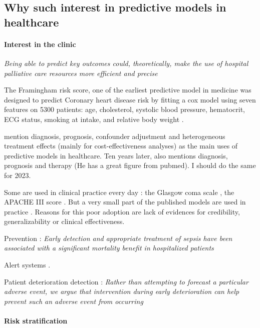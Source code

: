 \documentclass[french,12pt,twoside,a4paper]{book}
\begin{document}
\subsection{Why such interest in predictive models in healthcare}\label{subsec:predictive_models:importance}

\paragraph{Interest in the clinic}

\textit{Being able to predict key outcomes could, theoretically, make the use of
  hospital palliative care resources more efficient and precise} \citep{topol2019high}

The Framingham risk score, one of the earliest predictive model in medicine was
designed to predict Coronary heart disease risk by fitting a cox model using
seven features on 5300 patients: age, cholesterol, systolic blood pressure,
hematocrit, ECG status, smoking at intake, and relative body weight
\citep{brand1976multivariate}.

\citep{harrell2001regression} mention diagnosis, prognosis, confounder adjustment
and heterogeneous treatment effects (mainly for cost-effectiveness analyses) as
the main uses of predictive models in healthcare. Ten years later,
\citep{steyerberg2009applications} also mentions diagnosis, prognosis and therapy
(He has a great figure from pubmed). I should do the same for 2023.

Some are used in clinical practice every day : the Glasgow coma scale
\citep{teasdale1974assessment}, the APACHE III score \citep{knaus1991apache}.
But a very small part of the published models are used in practice
\citep{wyatt1995commentary}. Reasons for this poor adoption are lack of
evidences for credibility, generalizability or clinical effectiveness.

Prevention : \textit{Early detection and appropriate treatment of sepsis have
  been associated with a significant mortality benefit in hospitalized patients}
\citep{wong2021external}

Alert systems \citep{yu2018artificial}.

Patient deterioration detection \citep{rothman2013development}: \textit{Rather than attempting to forecast a particular
  adverse event, we argue that intervention during early deterioration can help prevent such an adverse event from
  occurring}

\paragraph{Risk stratification}
\end{document}
